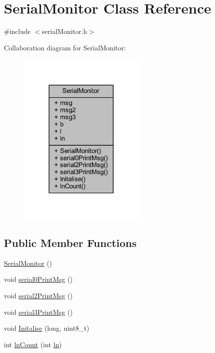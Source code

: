 \hypertarget{class_serial_monitor}{}\section{Serial\+Monitor Class Reference}
\label{class_serial_monitor}


{\ttfamily \#include $<$serial\+Monitor.\+h$>$}



Collaboration diagram for Serial\+Monitor\+:
\nopagebreak
\begin{figure}[H]
\begin{center}
\leavevmode
\includegraphics[width=179pt]{dc/dbf/class_serial_monitor__coll__graph}
\end{center}
\end{figure}
\subsection*{Public Member Functions}
\begin{DoxyCompactItemize}
\item 
\hyperlink{class_serial_monitor_aab6fdc35e8940fc33fc5805f106960e1}{Serial\+Monitor} ()
\item 
void \hyperlink{class_serial_monitor_a2d27ad4a626b5856b5bfa2ea833ce4b6}{serial0\+Print\+Msg} ()
\item 
void \hyperlink{class_serial_monitor_adca14d5a90debc9e60b84e3aff902d20}{serial2\+Print\+Msg} ()
\item 
void \hyperlink{class_serial_monitor_a2e2164f6a67a339e28e0fe566954fa06}{serial3\+Print\+Msg} ()
\item 
void \hyperlink{class_serial_monitor_a2747038f640e76c7b822d3c1ce8a8798}{Initalise} (long, uint8\+\_\+t)
\item 
int \hyperlink{class_serial_monitor_a22fad68f5119182034172883c2d6b49b}{ln\+Count} (int \hyperlink{class_serial_monitor_a927d39734bc5a2f14d2410166c3ad7d8}{ln})
\end{DoxyCompactItemize}

